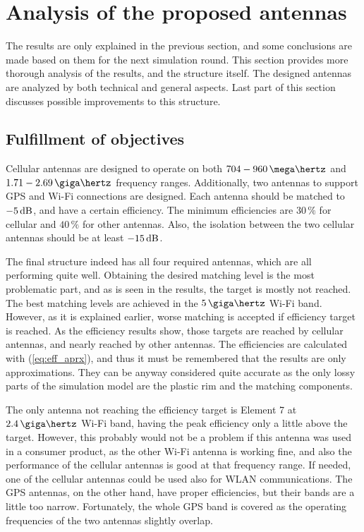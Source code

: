 \section{Analysis of the proposed antennas}
\label{sec:analysis}
The results are only explained in the previous section, and some conclusions are made based on them for the next simulation round. This section provides more thorough analysis of the results, and the structure itself. The designed antennas are analyzed by both technical and general aspects. Last part of this section discusses possible improvements to this structure.

\vspace{-7pt}
\subsection{Fulfillment of objectives}
\label{sec:fulfillment}
\vspace{-3pt}
Cellular antennas are designed to operate on both $704-960\,\mega\hertz$ and $1.71-2.69\,\giga\hertz$ frequency ranges. Additionally, two antennas to support GPS and Wi-Fi connections are designed. Each antenna should be matched to $-5\,\mathrm{dB}$, and have a certain efficiency. The minimum efficiencies are $30\,\%$ for cellular and $40\,\%$ for other antennas. Also, the isolation between the two cellular antennas should be at least $-15\,\mathrm{dB}$.

The final structure indeed has all four required antennas, which are all performing quite well. Obtaining the desired matching level is the most problematic part, and as is seen in the results, the target is mostly not reached. The best matching levels are achieved in the $5\,\giga\hertz$ Wi-Fi band. However, as it is explained earlier, worse matching is accepted if efficiency target is reached. As the efficiency results show, those targets are reached by cellular antennas, and nearly reached by other antennas. The efficiencies are calculated with (\ref{eq:eff_aprx}), and thus it must be remembered that the results are only approximations. They can be anyway considered quite accurate as the only lossy parts of the simulation model are the plastic rim and the matching components. 

The only antenna not reaching the efficiency target is Element 7 at $2.4\,\giga\hertz$ Wi-Fi band, having the peak efficiency only a little above the target. However, this probably would not be a problem if this antenna was used in a consumer product, as the other Wi-Fi antenna is working fine, and also the performance of the cellular antennas is good at that frequency range. If needed, one of the cellular antennas could be used also for WLAN communications. The GPS antennas, on the other hand, have proper efficiencies, but their bands are a little too narrow. Fortunately, the whole GPS band is covered as the operating frequencies of the two antennas slightly overlap.

